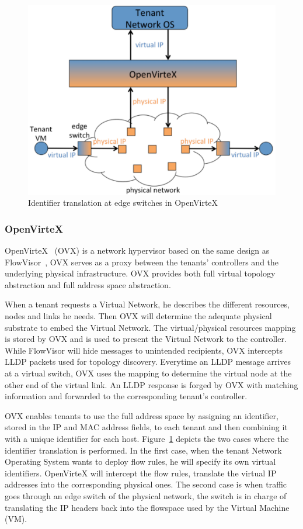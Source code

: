 \begin{figure}[ht]
    \centering
    \includegraphics[scale=0.7]{figures/openvirtex.pdf}
    \caption{Identifier translation at edge switches in OpenVirteX~\cite{OpenVirteX-Al-Shabibi2014}}
    \label{fig:openvirtex}
\end{figure}

\subsubsection{OpenVirteX}
OpenVirteX~\cite{OpenVirteX-Al-Shabibi2014} (OVX) is a network hypervisor based on the same design as FlowVisor~\cite{FlowVisor-Sherwood2009}, \ie OVX serves as a proxy between the tenants' controllers and the underlying physical infrastructure. OVX provides both full virtual topology abstraction and full address space abstraction. 

When a tenant requests a Virtual Network, he describes the different resources, nodes and links he needs.
Then OVX will determine the adequate physical substrate to embed the Virtual Network.
The virtual/physical resources mapping is stored by OVX and is used to present the Virtual Network to the controller.
While FlowVisor will hide messages to unintended recipients, OVX intercepts LLDP packets used for topology discovery. Everytime an LLDP message arrives at a virtual switch, OVX uses the mapping to determine the virtual node at the other end of the virtual link. An LLDP response is forged by OVX with matching information and forwarded to the corresponding tenant's controller.

OVX enables tenants to use the full address space by assigning an identifier, stored in the IP and MAC address fields, to each tenant and then combining it with a unique identifier for each host. Figure~\ref{fig:openvirtex} depicts the two cases where the identifier translation is performed. In the first case, when the tenant Network Operating System wants to deploy flow rules, he will specify its own virtual identifiers. OpenVirteX will intercept the flow rules, translate the virtual IP addresses into the corresponding physical ones. The second case is when traffic goes through an edge switch of the physical network, the switch is in charge of translating the IP headers back into the flowspace used by the Virtual Machine (VM).

